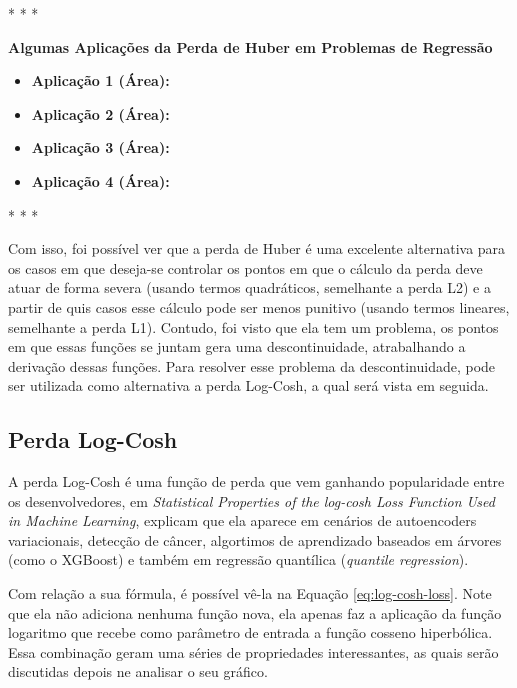 \medskip
\begin{center}
 * * *
\end{center}
\medskip

\textbf{Algumas Aplicações da Perda de Huber em Problemas de Regressão} 
\vspace{1em}

\begin{itemize}
    \item \textbf{Aplicação 1 (Área):}
    \item \textbf{Aplicação 2 (Área):}
    \item \textbf{Aplicação 3 (Área):}
    \item \textbf{Aplicação 4 (Área):}
\end{itemize}

\medskip
\begin{center}
 * * *
\end{center}
\medskip

Com isso, foi possível ver que a perda de Huber é uma excelente alternativa para os casos em que deseja-se controlar os pontos em que o cálculo da perda deve atuar de forma severa (usando termos quadráticos, semelhante a perda L2) e a partir de quis casos esse cálculo pode ser menos punitivo (usando termos lineares, semelhante a perda L1). Contudo, foi visto que ela tem um problema, os pontos em que essas funções se juntam gera uma descontinuidade, atrabalhando a derivação dessas funções. Para resolver esse problema da descontinuidade, pode ser utilizada como alternativa a perda Log-Cosh, a qual será vista em seguida.

\subsection{Perda Log-Cosh} 

A perda Log-Cosh é uma função de perda que vem ganhando popularidade entre os desenvolvedores, em \textit{Statistical Properties of the log-cosh Loss Function Used in Machine Learning}, \textcite{StatisticalPropetiesLogCosh} explicam que ela aparece em cenários de autoencoders variacionais, detecção de câncer, algortimos de aprendizado baseados em árvores (como o XGBoost) e também em regressão quantílica (\textit{quantile regression}).

Com relação a sua fórmula, é possível vê-la na Equação \ref{eq:log-cosh-loss}. Note que ela não adiciona nenhuma função nova, ela apenas faz a aplicação da função logaritmo que recebe como parâmetro de entrada a função cosseno hiperbólica. Essa combinação geram uma séries de propriedades interessantes, as quais serão discutidas depois ne analisar o seu gráfico.

